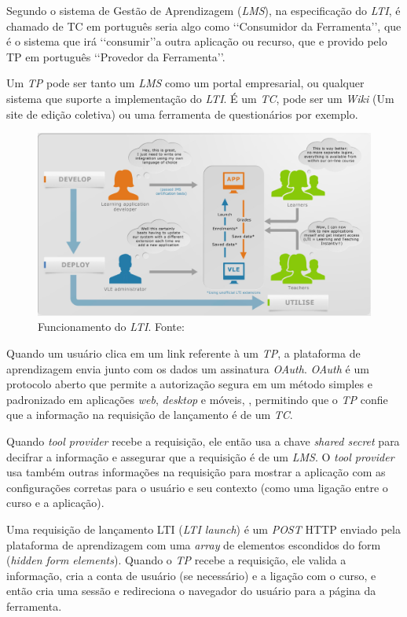 \par
Segundo  o sistema de Gestão de Aprendizagem (\textit{LMS}), na especificação do \textit{LTI}, é chamado de \ac{TC} em português seria algo como \lq\lq Consumidor da Ferramenta\rq\rq, que é o sistema que irá \lq\lq consumir\rq\rq a outra aplicação ou recurso, que e provido pelo \ac{TP} em português \lq\lq Provedor da Ferramenta\rq\rq.
\par
Um \textit{TP} pode ser tanto um \textit{LMS} como um portal empresarial, ou qualquer sistema que suporte a implementação do \textit{LTI}. É um \textit{TC}, pode ser um \textit{Wiki} (Um site de edição coletiva) ou uma ferramenta de questionários por exemplo.
\begin{figure}[h]
    \centering
    \label{fig:ims-lti-funcionamento}
    \includegraphics[keepaspectratio=true,scale=0.5]{figuras/ims-lti-funcionamento.png}
    \caption{Funcionamento do \textit{LTI}. Fonte: }
\end{figure}
\par
Quando um usuário clica em um link referente à um \textit{TP}, a plataforma de aprendizagem envia junto com os dados um assinatura \textit{OAuth}. \textit{OAuth} é um protocolo aberto que permite a autorização segura em um método simples e padronizado em aplicações \textit{web}, \textit{desktop} e móveis, \cite{oauth}, permitindo que o \textit{TP} confie que a informação na requisição de lançamento é de um \textit{TC}.
\par
Quando \textit{tool provider} recebe a requisição, ele então usa a chave \textit{shared secret} para decifrar a informação e assegurar que a requisição é de um \textit{LMS}. O \textit{tool provider} usa também outras informações na requisição para mostrar a aplicação com as configurações corretas para o usuário e seu contexto (como uma ligação entre o curso e a aplicação).
\par
Uma requisição de lançamento LTI (\textit{LTI launch}) é um \textit{POST} \ac{HTTP} enviado pela plataforma de aprendizagem com uma \textit{array} de elementos escondidos do form (\textit{hidden form elements}). Quando o \textit{TP} recebe a requisição, ele valida a informação, cria a conta de usuário (se necessário) e a ligação com o curso, e então cria uma sessão e redireciona o navegador do usuário para a página da ferramenta.

